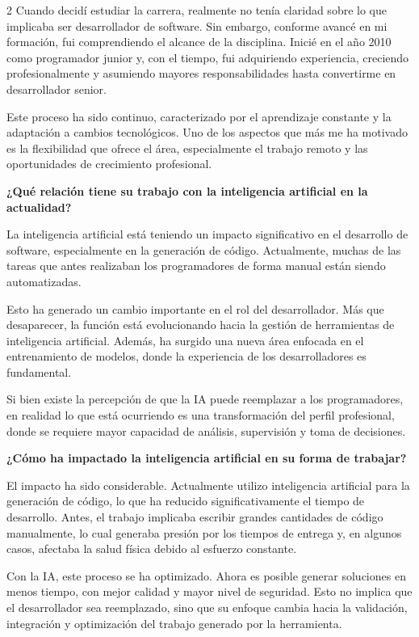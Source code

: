 \documentclass[10pt,spanish,Letterpaper,openany]{book}
\let\origtextbf\textbf
\renewcommand{\textbf}[1]{{\color{textlinetitle}\origtextbf{#1}}}
\begin{document}
\begin {multicols}{2}
Cuando decidí estudiar la carrera, realmente no tenía claridad sobre lo que implicaba ser desarrollador de software. Sin embargo, conforme avancé en mi formación, fui comprendiendo el alcance de la disciplina. Inicié en el año 2010 como programador junior y, con el tiempo, fui adquiriendo experiencia, creciendo profesionalmente y asumiendo mayores responsabilidades hasta convertirme en desarrollador senior.

Este proceso ha sido continuo, caracterizado por el aprendizaje constante y la adaptación a cambios tecnológicos. Uno de los aspectos que más me ha motivado es la flexibilidad que ofrece el área, especialmente el trabajo remoto y las oportunidades de crecimiento profesional.

\textbf{¿Qué relación tiene su trabajo con la inteligencia artificial en la actualidad?}

La inteligencia artificial está teniendo un impacto significativo en el desarrollo de software, especialmente en la generación de código. Actualmente, muchas de las tareas que antes realizaban los programadores de forma manual están siendo automatizadas.

Esto ha generado un cambio importante en el rol del desarrollador. Más que desaparecer, la función está evolucionando hacia la gestión de herramientas de inteligencia artificial. Además, ha surgido una nueva área enfocada en el entrenamiento de modelos, donde la experiencia de los desarrolladores es fundamental.

Si bien existe la percepción de que la IA puede reemplazar a los programadores, en realidad lo que está ocurriendo es una transformación del perfil profesional, donde se requiere mayor capacidad de análisis, supervisión y toma de decisiones.

\textbf{¿Cómo ha impactado la inteligencia artificial en su forma de trabajar?}

El impacto ha sido considerable. Actualmente utilizo inteligencia artificial para la generación de código, lo que ha reducido significativamente el tiempo de desarrollo. Antes, el trabajo implicaba escribir grandes cantidades de código manualmente, lo cual generaba presión por los tiempos de entrega y, en algunos casos, afectaba la salud física debido al esfuerzo constante.

Con la IA, este proceso se ha optimizado. Ahora es posible generar soluciones en menos tiempo, con mejor calidad y mayor nivel de seguridad. Esto no implica que el desarrollador sea reemplazado, sino que su enfoque cambia hacia la validación, integración y optimización del trabajo generado por la herramienta.


\end{multicols}
\end{document}
